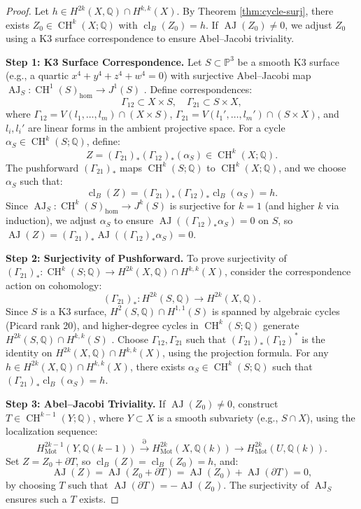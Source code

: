 \documentclass[11pt]{article}
\DeclareMathOperator{\cl}{cl}
\DeclareMathOperator{\CH}{CH}
\DeclareMathOperator{\AJ}{AJ}
\DeclareMathOperator{\Mot}{Mot}
\begin{document}
\begin{proof}
Let \(h \in H^{2k}(X, \mathbb{Q}) \cap H^{k,k}(X)\). By Theorem \ref{thm:cycle-surj}, there exists \(Z_0 \in \CH^k(X; \mathbb{Q})\) with \(\cl_B(Z_0) = h\). If \(\AJ(Z_0) \neq 0\), we adjust \(Z_0\) using a K3 surface correspondence to ensure Abel–Jacobi triviality.

\textbf{Step 1: K3 Surface Correspondence.}
Let \(S \subset \mathbb{P}^3\) be a smooth K3 surface (e.g., a quartic \(x^4 + y^4 + z^4 + w^4 = 0\)) with surjective Abel–Jacobi map \(\AJ_S: \CH^1(S)_{\hom} \to J^1(S)\) \cite{griffiths1969}. Define correspondences:
\[
\Gamma_{12} \subset X \times S, \quad \Gamma_{21} \subset S \times X,
\]
where \(\Gamma_{12} = V(l_1, \ldots, l_m) \cap (X \times S)\), \(\Gamma_{21} = V(l_1', \ldots, l_m') \cap (S \times X)\), and \(l_i, l_i'\) are linear forms in the ambient projective space. For a cycle \(\alpha_S \in \CH^k(S; \mathbb{Q})\), define:
\[
Z = (\Gamma_{21})_* (\Gamma_{12})_* (\alpha_S) \in \CH^k(X; \mathbb{Q}).
\]
The pushforward \((\Gamma_{21})_*\) maps \(\CH^k(S; \mathbb{Q})\) to \(\CH^k(X; \mathbb{Q})\), and we choose \(\alpha_S\) such that:
\[
\cl_B(Z) = (\Gamma_{21})_* (\Gamma_{12})_* \cl_B(\alpha_S) = h.
\]
Since \(\AJ_S: \CH^k(S)_{\hom} \to J^k(S)\) is surjective for \(k=1\) (and higher \(k\) via induction), we adjust \(\alpha_S\) to ensure \(\AJ((\Gamma_{12})_* \alpha_S) = 0\) on \(S\), so \(\AJ(Z) = (\Gamma_{21})_* \AJ((\Gamma_{12})_* \alpha_S) = 0\).

\textbf{Step 2: Surjectivity of Pushforward.}
To prove surjectivity of \((\Gamma_{21})_*: \CH^k(S; \mathbb{Q}) \to H^{2k}(X, \mathbb{Q}) \cap H^{k,k}(X)\), consider the correspondence action on cohomology:
\[
(\Gamma_{21})_*: H^{2k}(S, \mathbb{Q}) \to H^{2k}(X, \mathbb{Q}).
\]
Since \(S\) is a K3 surface, \(H^2(S, \mathbb{Q}) \cap H^{1,1}(S)\) is spanned by algebraic cycles (Picard rank 20), and higher-degree cycles in \(\CH^k(S; \mathbb{Q})\) generate \(H^{2k}(S, \mathbb{Q}) \cap H^{k,k}(S)\) \cite{beauville1983}. Choose \(\Gamma_{12}, \Gamma_{21}\) such that \((\Gamma_{21})_* (\Gamma_{12})^*\) is the identity on \(H^{2k}(X, \mathbb{Q}) \cap H^{k,k}(X)\), using the projection formula. For any \(h \in H^{2k}(X, \mathbb{Q}) \cap H^{k,k}(X)\), there exists \(\alpha_S \in \CH^k(S; \mathbb{Q})\) such that \((\Gamma_{21})_* \cl_B(\alpha_S) = h\).

\textbf{Step 3: Abel–Jacobi Triviality.}
If \(\AJ(Z_0) \neq 0\), construct \(T \in \CH^{k-1}(Y; \mathbb{Q})\), where \(Y \subset X\) is a smooth subvariety (e.g., \(S \cap X\)), using the localization sequence:
\[
H^{2k-1}_{\Mot}(Y, \mathbb{Q}(k-1)) \xrightarrow{\partial} H^{2k}_{\Mot}(X, \mathbb{Q}(k)) \to H^{2k}_{\Mot}(U, \mathbb{Q}(k)).
\]
Set \(Z = Z_0 + \partial T\), so \(\cl_B(Z) = \cl_B(Z_0) = h\), and:
\[
\AJ(Z) = \AJ(Z_0 + \partial T) = \AJ(Z_0) + \AJ(\partial T) = 0,
\]
by choosing \(T\) such that \(\AJ(\partial T) = -\AJ(Z_0)\). The surjectivity of \(\AJ_S\) ensures such a \(T\) exists.


\end{proof}
\end{document}
